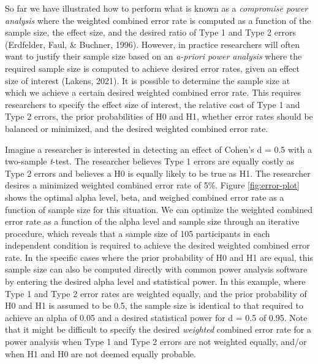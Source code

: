 \documentclass[
  english,
  ,man, a4paper,floatsintext]{apa6}
\begin{document}
So far we have illustrated how to perform what is known as a \emph{compromise power analysis} where the weighted combined error rate is computed as a function of the sample size, the effect size, and the desired ratio of Type 1 and Type 2 errors (Erdfelder, Faul, \& Buchner, 1996). However, in practice researchers will often want to justify their sample size based on an \emph{a-priori power analysis} where the required sample size is computed to achieve desired error rates, given an effect size of interest (Lakens, 2021). It is possible to determine the sample size at which we achieve a certain desired weighted combined error rate. This requires researchers to specify the effect size of interest, the relative cost of Type 1 and Type 2 errors, the prior probabilities of H0 and H1, whether error rates should be balanced or minimized, and the desired weighted combined error rate.

Imagine a researcher is interested in detecting an effect of Cohen's d = 0.5 with a two-sample \emph{t}-test. The researcher believes Type 1 errors are equally costly as Type 2 errors and believes a H0 is equally likely to be true as H1. The researcher desires a minimized weighted combined error rate of 5\%. Figure \ref{fig:error-plot} shows the optimal alpha level, beta, and weighed combined error rate as a function of sample size for this situation. We can optimize the weighted combined error rate as a function of the alpha level and sample size through an iterative procedure, which reveals that a sample size of 105 participants in each independent condition is required to achieve the desired weighted combined error rate. In the specific cases where the prior probability of H0 and H1 are equal, this sample size can also be computed directly with common power analysis software by entering the desired alpha level and statistical power. In this example, where Type 1 and Type 2 error rates are weighted equally, and the prior probability of H0 and H1 is assumed to be 0.5, the sample size is identical to that required to achieve an alpha of 0.05 and a desired statistical power for d = 0.5 of 0.95. Note that it might be difficult to specify the desired \emph{weighted} combined error rate for a power analysis when Type 1 and Type 2 errors are not weighted equally, and/or when H1 and H0 are not deemed equally probable.
\end{document}
